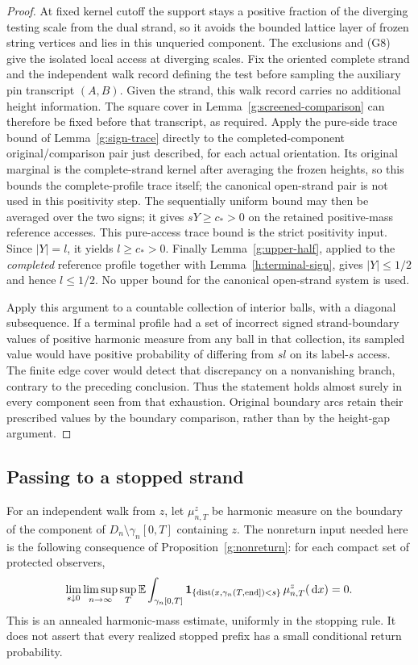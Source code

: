 \begin{proof}
At fixed kernel cutoff the support stays a positive fraction of the
diverging testing scale from the dual strand, so it avoids the bounded
lattice layer of frozen string vertices and lies in this unqueried
component. The exclusions and (G8) give the isolated local access at
diverging scales. Fix the oriented complete strand and the independent
walk record defining the test before sampling the auxiliary pin
transcript $(A,B)$. Given the strand, this walk record carries no
additional height information. The square cover in
Lemma~\ref{g:screened-comparison} can therefore be fixed before that
transcript, as required. Apply the pure-side trace bound of
Lemma~\ref{g:sign-trace} directly to the completed-component
original/comparison pair just described, for each actual orientation.
Its original marginal is the complete-strand kernel after averaging
the frozen heights, so this bounds the complete-profile trace itself;
the canonical open-strand pair is not used in this positivity step.
The sequentially uniform bound may then be averaged over the two
signs; it gives $sY\ge c_*>0$ on the retained positive-mass reference
accesses. This pure-access trace bound is the strict positivity input.
Since $|Y|=l$, it yields $l\ge c_*>0$.
Finally Lemma~\ref{g:upper-half}, applied to the
\emph{completed} reference profile together with
Lemma~\ref{h:terminal-sign}, gives $|Y|\le1/2$ and hence $l\le1/2$.
No upper bound for the canonical open-strand system is used.

Apply this argument to a countable collection of interior balls, with
a diagonal subsequence. If a terminal profile had a set of incorrect
signed strand-boundary values of positive harmonic measure from any
ball in that collection, its sampled value would have positive
probability of differing from $sl$ on its label-$s$ access. The finite
edge cover would detect that discrepancy on a nonvanishing branch,
contrary to the preceding conclusion. Thus the statement holds almost
surely in every component seen from that exhaustion. Original boundary
arcs retain their prescribed values by the boundary comparison,
rather than by the height-gap argument.
\end{proof}

\subsection{Passing to a stopped strand}

For an independent walk from $z$, let $\mu^z_{n,T}$ be harmonic measure on
the boundary of the component of $D_n\setminus\gamma_n[0,T]$ containing
$z$. The nonreturn input needed here is the following consequence of
Proposition~\ref{g:nonreturn}: for each compact set of protected observers,
\begin{equation}\label{h:nr}
 \lim_{s\downarrow0}\limsup_{n\to\infty}\sup_T
 \mathbb E\int_{\gamma_n[0,T]}
 \mathbf1_{\{\operatorname{dist}(x,\gamma_n(T,\mathrm{end}])<s\}}
       \,\mu^z_{n,T}(\,\mathrm d x)=0.
\end{equation}
This is an annealed harmonic-mass estimate, uniformly in the stopping
rule. It does not assert that every realized stopped prefix has a
small conditional return probability.

